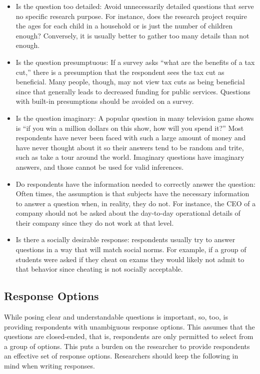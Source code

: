 \begin{itemize}
	\item Is the question too detailed: Avoid unnecessarily detailed questions that serve no specific research purpose. For instance, does the research project require the ages for each child in a household or is just the number of children enough? Conversely, it is usually better to gather too many details than not enough.

	\item Is the question presumptuous: If a survey asks ``what are the benefits of a tax cut,'' there is a presumption that the respondent sees the tax cut as beneficial. Many people, though, may not view tax cuts as being beneficial since that generally leads to decreased funding for public services. Questions with built-in presumptions should be avoided on a survey.

	\item Is the question imaginary: A popular question in many television game shows is ``if you win a million dollars on this show, how will you spend it?'' Most respondents have never been faced with such a large amount of money and have never thought about it so their answers tend to be random and trite, such as take a tour around the world. Imaginary questions have imaginary answers, and those cannot be used for valid inferences.

	\item Do respondents have the information needed to correctly answer the question: Often times, the assumption is that subjects have the necessary information to answer a question when, in reality, they do not. For instance, the CEO of a company should not be asked about the day-to-day operational details of their company since they do not work at that level.

	\item Is there a socially desirable response: respondents usually try to answer questions in a way that will match social norms. For example, if a group of students were asked if they cheat on exams they would likely not admit to that behavior since cheating is not socially acceptable. 
\end{itemize}

\subsection{Response Options}

While posing clear and understandable questions is important, so, too, is providing respondents with unambiguous response options. This assumes that the questions are closed-ended, that is, respondents are only permitted to select from a group of options. This puts a burden on the researcher to provide respondents an effective set of response options. Researchers should keep the following in mind when writing responses.

